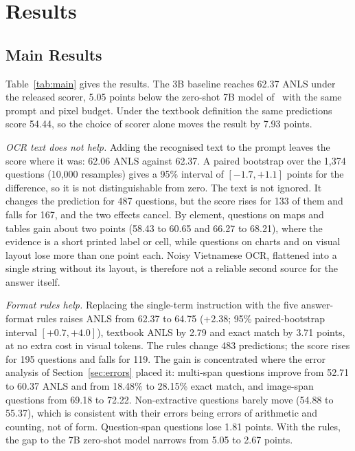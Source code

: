 \documentclass[conference]{IEEEtran}
\begin{document}
\section{Results}
\label{sec:results}

\subsection{Main Results}
Table~\ref{tab:main} gives the results. The 3B baseline reaches 62.37 ANLS under the released scorer, 5.05 points below the zero-shot 7B model of~\cite{viinfographicvqa} with the same prompt and pixel budget. Under the textbook definition the same predictions score 54.44, so the choice of scorer alone moves the result by 7.93 points.

\emph{OCR text does not help.} Adding the recognised text to the prompt leaves the score where it was: 62.06 ANLS against 62.37. A paired bootstrap over the 1{,}374 questions (10{,}000 resamples) gives a 95\% interval of $[-1.7, +1.1]$ points for the difference, so it is not distinguishable from zero. The text is not ignored. It changes the prediction for 487 questions, but the score rises for 133 of them and falls for 167, and the two effects cancel. By element, questions on maps and tables gain about two points (58.43 to 60.65 and 66.27 to 68.21), where the evidence is a short printed label or cell, while questions on charts and on visual layout lose more than one point each. Noisy Vietnamese OCR, flattened into a single string without its layout, is therefore not a reliable second source for the answer itself.

\emph{Format rules help.} Replacing the single-term instruction with the five answer-format rules raises ANLS from 62.37 to 64.75 (+2.38; 95\% paired-bootstrap interval $[+0.7, +4.0]$), textbook ANLS by 2.79 and exact match by 3.71 points, at no extra cost in visual tokens. The rules change 483 predictions; the score rises for 195 questions and falls for 119. The gain is concentrated where the error analysis of Section~\ref{sec:errors} placed it: multi-span questions improve from 52.71 to 60.37 ANLS and from 18.48\% to 28.15\% exact match, and image-span questions from 69.18 to 72.22. Non-extractive questions barely move (54.88 to 55.37), which is consistent with their errors being errors of arithmetic and counting, not of form. Question-span questions lose 1.81 points. With the rules, the gap to the 7B zero-shot model narrows from 5.05 to 2.67 points.
\end{document}
